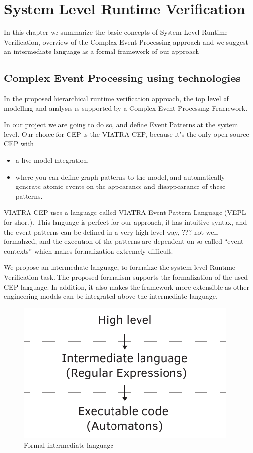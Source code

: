 \chapter{System Level Runtime Verification}
	\label{chap:cep}
		In this chapter we summarize the basic concepts of System Level Runtime Verification,
		overview of the Complex Event Processing approach and we suggest an intermediate language as a formal framework of our approach
	
	\section{Complex Event Processing using technologies}
	
	
	
		In the proposed hierarchical runtime verification approach, the top level of modelling and analysis is supported by a Complex Event Processing Framework.
		
		In our project we are going to do so, and define Event Patterns at the system level.
		Our choice for CEP is the VIATRA CEP, because it's the only open source CEP with 
		\begin{itemize}
			\item a live model integration, 
			\item where you can define graph patterns to the model, and automatically generate atomic events on the appearance and disappearance of these patterns.
		\end{itemize}
		
		
		VIATRA CEP uses a language called VIATRA Event Pattern Language (VEPL for short).
		This language is perfect for our approach, it has intuitive syntax, and the event patterns can be defined in
		a very high level way, ??? not well-formalized, and the
		execution of the patterns are dependent on so called ``event contexts'' which makes formalization extremely difficult.
		
		We propose an intermediate language, to formalize the system level Runtime Verification task.
		The proposed formalism supports the formalization of the used CEP language.
		In addition, it also makes the framework more extensible as other engineering models can be integrated above the intermediate language.
		
		\begin{figure}[h]
		\centering
		\includegraphics[width=0.7\linewidth]{include/figures/chapter_5/sandwich}
		\caption{Formal intermediate language}
		\label{fig:cep:sandwich}
		\end{figure}


